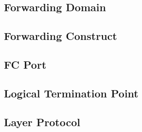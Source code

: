 \subsection{Forwarding Domain}

\subsection{Forwarding Construct}

\subsection{FC Port}

\subsection{Logical Termination Point}

\subsection{Layer Protocol}
